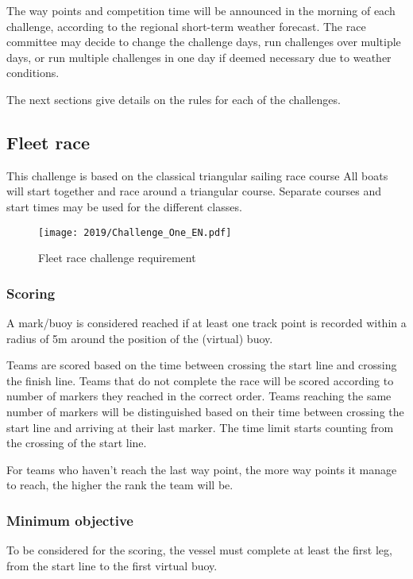 \documentclass[12pt]{article}
\begin{document}
The way points and competition time will be announced in the morning of each challenge, 
according to the regional short-term weather forecast.
The race committee may decide to change the challenge days, run challenges over
multiple days, or run multiple challenges in one day if deemed necessary due 
to weather conditions.

The next sections give details on the rules for each of the challenges.

\subsection{Fleet race}

This challenge is based on the classical triangular sailing race course
All boats will start together and race around a triangular course. Separate
courses and start times may be used for the different classes.

\begin{figure}[H]
  \centering
  \texttt{[image: 2019/Challenge\_One\_EN.pdf]}
  \caption{Fleet race challenge requirement}
  \label{fig:fleetrace}
\end{figure}

\subsubsection{Scoring}
A mark/buoy is considered reached if at least one
track point is recorded within a radius of 5m around the position of the
(virtual) buoy.

Teams are scored based on the time between crossing the start line and crossing
the finish line. Teams that do not complete the race will be scored
according to number of markers they reached in the correct order. Teams reaching
the same number of markers will be distinguished based on their time between
crossing the start line and arriving at their last marker. 
The time limit starts counting from the crossing of the start line.

For teams who haven't reach the last way point, the more way points it manage to reach, the higher the rank the team will be.


\subsubsection{Minimum objective}
To be considered for the scoring, the vessel must complete at least the first
leg, from the start line to the first virtual buoy.
\end{document}
